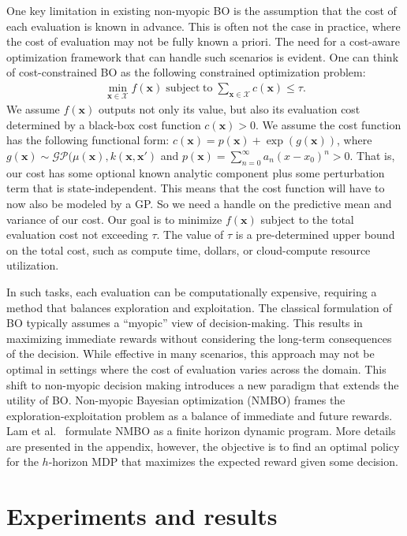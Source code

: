 \documentclass{article}
\newcommand{\bfx}{\textbf{x}}
\begin{document}
One key limitation in existing non-myopic BO is the 
assumption that the cost of each evaluation is known in advance. 
This is often not the case in practice, where the cost of 
evaluation may not be fully known a priori. The need for a cost-aware optimization framework that can handle such scenarios is 
evident. One can think of cost-constrained BO as the following constrained optimization problem:
\begin{align*}
\min_{\bfx \in \mathcal{X}} f(\bfx)
\operatorname{subject \; to} \sum_{\bfx \in \mathcal{X}} c(\bfx)
\leq \tau.
\end{align*}
We assume $f(\bfx)$ outputs not only its value, but also its evaluation cost determined by a 
black-box cost function $c(\bfx) > 0$. We assume the cost function has the following functional
form: $c(\bfx) = p(\bfx) + \exp(g(\bfx))$, where $g(\bfx) \sim \mathcal{GP}(\mu(\bfx), k(\bfx, \bfx')$ and $p(\bfx) = 
\sum_{n=0}^{\infty} a_n(x - x_0)^n > 0$. That is, our cost has some 
optional known analytic component plus some perturbation term 
that is state-independent. This means that the cost function will have to now also be modeled by a GP. So we need a handle on the predictive mean and variance of our cost.
Our goal is to minimize $f(\bfx)$ subject to the total evaluation cost not exceeding $\tau$. The value of
$\tau$ is a pre-determined upper bound on the total cost, such as compute time, dollars, or
cloud-compute resource utilization.


In such tasks, each evaluation can be 
computationally expensive, requiring a method that balances 
exploration and exploitation.
The classical formulation of BO typically assumes a ``myopic'' 
view of decision-making. This results in maximizing immediate 
rewards without considering the long-term consequences of the 
decision. While effective in many scenarios, this approach may 
not be optimal in settings where the cost of evaluation varies 
across the domain. This shift to non-myopic decision making 
introduces a new paradigm that extends the utility of BO.
Non-myopic Bayesian optimization (NMBO) frames the exploration-exploitation problem as a balance of immediate and future 
rewards. Lam et al.~\cite{Lam2016} formulate NMBO as a finite 
horizon dynamic program. More details are presented in the appendix, however, the objective is to find an optimal policy
for the $h$-horizon MDP that maximizes the expected reward
given some decision.

\section{Experiments and results}
\end{document}
